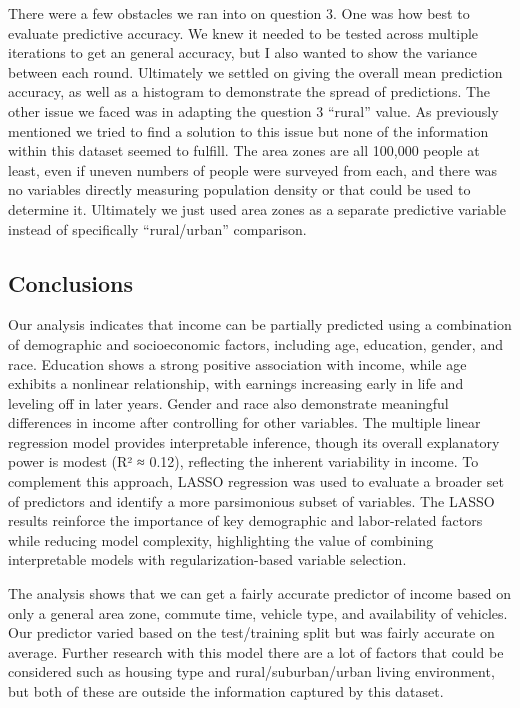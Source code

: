 \documentclass[
  letterpaper,
  DIV=11,
  numbers=noendperiod]{scrartcl}
\begin{document}
There were a few obstacles we ran into on question 3. One was how best
to evaluate predictive accuracy. We knew it needed to be tested across
multiple iterations to get an general accuracy, but I also wanted to
show the variance between each round. Ultimately we settled on giving
the overall mean prediction accuracy, as well as a histogram to
demonstrate the spread of predictions. The other issue we faced was in
adapting the question 3 ``rural'' value. As previously mentioned we
tried to find a solution to this issue but none of the information
within this dataset seemed to fulfill. The area zones are all 100,000
people at least, even if uneven numbers of people were surveyed from
each, and there was no variables directly measuring population density
or that could be used to determine it. Ultimately we just used area
zones as a separate predictive variable instead of specifically
``rural/urban'' comparison.

\subsection{Conclusions}\label{conclusions}

Our analysis indicates that income can be partially predicted using a
combination of demographic and socioeconomic factors, including age,
education, gender, and race. Education shows a strong positive
association with income, while age exhibits a nonlinear relationship,
with earnings increasing early in life and leveling off in later years.
Gender and race also demonstrate meaningful differences in income after
controlling for other variables. The multiple linear regression model
provides interpretable inference, though its overall explanatory power
is modest (R² ≈ 0.12), reflecting the inherent variability in income. To
complement this approach, LASSO regression was used to evaluate a
broader set of predictors and identify a more parsimonious subset of
variables. The LASSO results reinforce the importance of key demographic
and labor-related factors while reducing model complexity, highlighting
the value of combining interpretable models with regularization-based
variable selection.

The analysis shows that we can get a fairly accurate predictor of income
based on only a general area zone, commute time, vehicle type, and
availability of vehicles. Our predictor varied based on the
test/training split but was fairly accurate on average. Further research
with this model there are a lot of factors that could be considered such
as housing type and rural/suburban/urban living environment, but both of
these are outside the information captured by this dataset.
\end{document}
